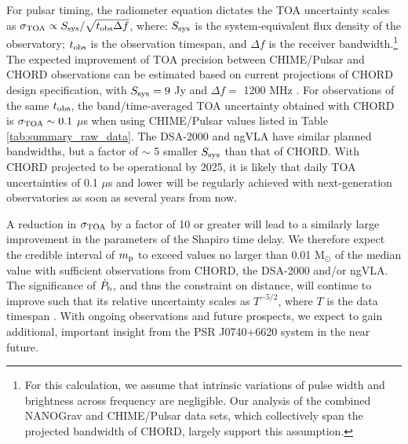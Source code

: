 \documentclass[twocolumn]{aastex63}
\newcommand{\chimepsr}{CHIME/Pulsar}
\newcommand{\pbdot}{$\dot{P}_{\rm b}$}
\begin{document}
For pulsar timing, the radiometer equation dictates the TOA uncertainty scales as $\sigma_{\rm TOA} \propto S_{\rm sys}/\sqrt{t_{\rm obs}\Delta f}$, where: $S_{\rm sys}$ is the system-equivalent flux density of the observatory; $t_{\rm obs}$ is the observation timespan, and $\Delta f$ is the receiver bandwidth.\footnote{For this calculation, we assume that intrinsic variations of pulse width and brightness across frequency are negligible. Our analysis of the combined NANOGrav and \chimepsr{} data sets, which collectively span the projected bandwidth of CHORD, largely support this assumption.} The expected improvement of TOA precision between \chimepsr{} \citep[with $S_{\rm sys} \approx 50$ Jy;][]{abb+20} and CHORD observations can be estimated based on current projections of CHORD design specification, with $S_{\rm sys} = 9$ Jy and $\Delta f =$ 1200 MHz \citep{vlg+19}. For observations of the same $t_{\rm obs}$, the band/time-averaged TOA uncertainty obtained with CHORD is $\sigma_{\rm TOA} \sim 0.1$ $\mu$s when using \chimepsr{} values listed in Table \ref{tab:summary_raw_data}. The DSA-2000 and ngVLA have similar planned bandwidths, but a factor of $\sim$ 5 smaller $S_{\rm sys}$ than that of CHORD. With CHORD projected to be operational by 2025, it is likely that daily TOA uncertainties of 0.1 $\mu$s and lower will be regularly achieved with next-generation observatories as soon as several years from now.

A reduction in $\sigma_{\rm TOA}$ by a factor of 10 or greater will lead to a similarly large improvement in the parameters of the Shapiro time delay. We therefore expect the credible interval of $m_{\rm p}$ to exceed values no larger than 0.01 M$_\odot$ of the median value with sufficient observations from CHORD, the DSA-2000 and/or ngVLA. The significance of \pbdot{}, and thus the constraint on distance, will continue to improve such that its relative uncertainty scales as $T^{-5/2}$, where $T$ is the data timespan \citep{dt92}. With ongoing observations and future prospects, we expect to gain additional, important insight from the PSR J0740+6620 system in the near future.
\end{document}
